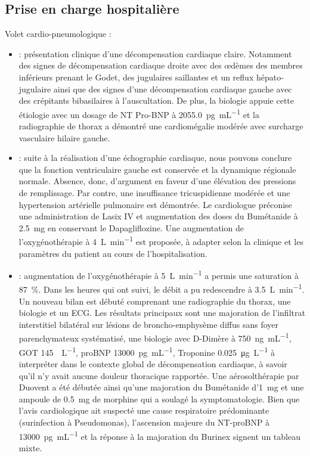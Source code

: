 \subsection{Prise en charge hospitalière}
Volet cardio-pneumologique : 
\begin{itemize}[label=\textbullet]
    \item {} : présentation clinique d’une décompensation cardiaque claire. Notamment des signes de décompensation cardiaque droite avec des œdèmes des membres inférieurs prenant le Godet, des jugulaires saillantes et un reflux hépato-jugulaire ainsi que des signes d’une décompensation cardiaque gauche avec des crépitants bibasilaires à l’auscultation. De plus, la biologie appuie cette étiologie avec un dosage de NT Pro-BNP à \qty{2055.0}{\pg\per\mL} et la radiographie de thorax a démontré une cardiomégalie modérée avec surcharge vasculaire hilaire gauche.
    \item  {} : suite à la réalisation d’une échographie cardiaque, nous pouvons conclure que la fonction ventriculaire gauche est conservée et la dynamique régionale normale. Absence, donc, d’argument en faveur d’une élévation des pressions de remplissage. Par contre, une insuffisance tricuspidienne modérée et une hypertension artérielle pulmonaire est démontrée. Le cardiologue préconise une administration de Lasix IV et augmentation des doses du  Bumétanide  à \qty{2.5}{\mg} en conservant le Dapagliflozine. Une augmentation de l’oxygénothérapie à \qty{4}{\L\per\minute} est proposée, à adapter selon la clinique et les paramètres du patient au cours de l’hospitalisation.
    \item {} : augmentation de l’oxygénothérapie à \qty{5}{\L\per\minute} a permis une saturation à \qty{87}{\percent}. Dans les heures qui ont suivi, le débit a pu redescendre à \qty{3.5}{\L\per\minute}. Un nouveau bilan est débuté comprenant une radiographie du thorax, une biologie et un ECG. Les résultats principaux sont une majoration de l’infiltrat interstitiel bilatéral sur lésions de broncho-emphysème diffus sans foyer parenchymateux systématisé, une biologie avec D-Dimère à \qty{750}{\ng\per\mL}, GOT \qty{145}{\enzymU\per\L}, proBNP \qty{13000}{\pg\per\mL}, Troponine \qty{0.025}{\ug\per\L} à interpréter dans le contexte global de décompensation cardiaque, à savoir qu’il n’y avait aucune douleur thoracique rapportée. Une aérosolthérapie par Duovent a été débutée ainsi qu’une majoration du Bumétanide d’\qty{1}{\mg} et une ampoule de \qty{0.5}{\mg} de morphine qui a soulagé la symptomatologie. Bien que l'avis cardiologique ait suspecté une cause respiratoire prédominante (surinfection à Pseudomonas), l'ascension majeure du NT-proBNP à \qty{13000}{\pg\per\mL} et la réponse à la majoration du Burinex signent un tableau mixte. 
\end{itemize}

